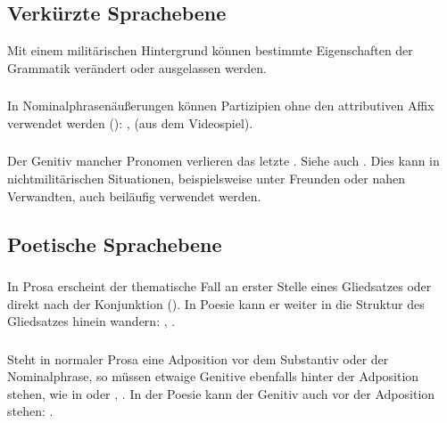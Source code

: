 \subsection{Verk\"urzte Sprachebene} Mit einem milit\"arischen Hintergrund k\"onnen
bestimmte Eigenschaften der Grammatik ver\"andert oder ausgelassen werden.

\subsubsection{} In Nominalphrasen\"au\ss{}erungen k\"onnen Partizipien ohne den
attributiven Affix  verwendet werden ():
,  (aus dem Videospiel).

\subsubsection{} Der Genitiv mancher Pronomen verlieren das letzte . Siehe
auch . Dies kann in nichtmilit\"arischen Situationen,
beispielsweise unter Freunden oder nahen Verwandten, auch beil\"aufig verwendet werden.


\subsection{Poetische Sprachebene}

\subsubsection{} In Prosa erscheint der thematische Fall an erster Stelle eines
Gliedsatzes oder direkt nach der Konjunktion ().
In Poesie kann er weiter in die Struktur des Gliedsatzes hinein wandern:
, .

\subsubsection{} Steht in normaler Prosa eine Adposition vor dem Substantiv oder der
Nominalphrase, so m\"ussen etwaige Genitive ebenfalls hinter der Adposition stehen,
wie in  oder , . In der
Poesie kann der Genitiv auch vor der Adposition stehen: . 
